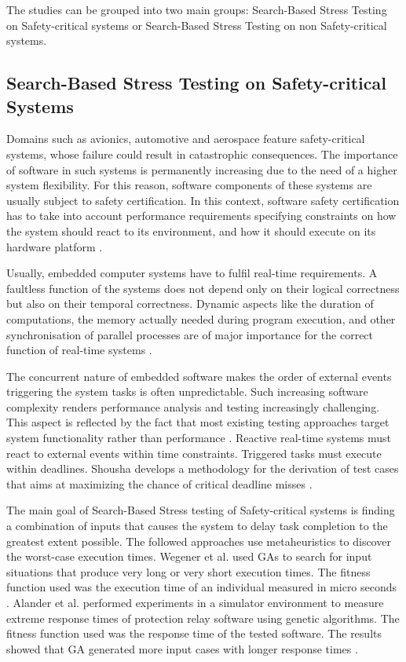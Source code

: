 \documentclass[espaco=umemeio,chapter=TITLE,twoside,openright]{abnt}
\begin{document}
The studies can be grouped into two main groups: Search-Based Stress Testing on Safety-critical systems or Search-Based Stress Testing on non Safety-critical systems.


\subsection{Search-Based Stress Testing on Safety-critical Systems}

Domains such as avionics, automotive and aerospace feature safety-critical systems, whose failure could result in catastrophic consequences.  The importance
of software in such systems is permanently increasing due to the need of a higher system
flexibility. For this reason, software components of these systems are usually subject to safety certification. In this context, software safety certification has to take into account performance requirements specifying constraints on how the system should react to its environment, and how it should execute on its hardware platform \cite{DiAlesio2013}.

Usually, embedded computer systems have to fulfil real-time requirements. A faultless function of the systems does not depend only on their logical correctness but also on their temporal correctness. Dynamic aspects like the duration of computations, the memory actually needed during program execution, and other synchronisation of parallel processes are of major importance for the correct function of real-time systems  \cite{J.WegenerK.GrimmM.GrochtmannH.Sthamer1996} .

The concurrent nature of embedded software makes  the order of external events triggering the system tasks is often unpredictable. Such increasing software complexity
renders performance analysis and testing increasingly
challenging. This aspect is reflected by the fact that most existing testing approaches target system functionality rather than performance \cite{DiAlesio2013}. Reactive real-time systems must react to external events within time constraints. Triggered tasks must execute within deadlines. Shousha develops a methodology for the derivation of test cases that aims at maximizing the chance of critical deadline misses \cite{shousha2003performance}.

The main goal of Search-Based Stress testing of Safety-critical systems is finding a combination of inputs that causes the system to delay task completion to the greatest extent possible. The followed approaches use metaheuristics to discover the worst-case execution times. Wegener et al. \cite{Wegener1997} used GAs to search for input situations that produce very long or very short execution times. The fitness function used was the execution time of an individual measured in micro seconds \cite{Wegener1997}. Alander et al. \cite{Alander} performed experiments in a simulator environment to measure extreme response times of protection relay software using genetic algorithms. The fitness function used was the response time of the tested software. The results showed that GA generated more input cases with longer response times \cite{Alander}.
\end{document}
